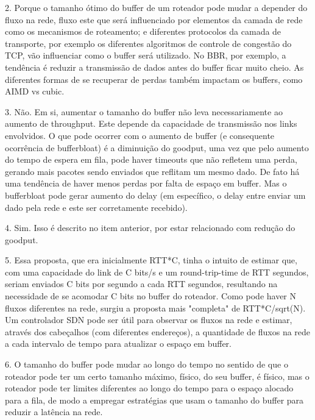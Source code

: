 \documentclass[a4paper,12pt]{article}
\begin{document}
2. Porque o tamanho ótimo do buffer de um roteador pode mudar a depender do fluxo na rede, fluxo este que será influenciado por elementos da camada de rede como os mecanismos de roteamento; e diferentes protocolos da camada de transporte, por exemplo os diferentes algoritmos de controle de congestão do TCP, vão influenciar como o buffer será utilizado. No BBR, por exemplo, a tendência é reduzir a transmissão de dados antes do buffer ficar  muito cheio. As diferentes formas de se recuperar de perdas também impactam os buffers,  como AIMD vs cubic.

3. Não. Em si, aumentar o tamanho do buffer não leva necessariamente ao aumento de throughput. Este depende da capacidade de transmissão nos links envolvidos. O que pode ocorrer com o  aumento de buffer (e consequente ocorrência de bufferbloat) é a diminuição do goodput, uma vez que pelo aumento do tempo de espera em fila, pode haver timeouts que não refletem uma perda, gerando mais pacotes sendo enviados que reflitam um mesmo dado. De fato há uma tendência de haver menos perdas por falta de espaço em buffer. Mas o bufferbloat pode gerar aumento do delay (em específico, o delay entre enviar um dado pela rede e este ser corretamente recebido).

4. Sim. Isso é descrito no item anterior, por estar relacionado com redução do goodput.	

5. Essa proposta, que era inicialmente RTT*C, tinha o intuito de estimar que, com uma capacidade do link de C bits/s e um round-trip-time de RTT segundos, seriam enviados C bits por segundo a cada RTT segundos, resultando na necessidade de se acomodar C bits no buffer do roteador. Como  pode haver N fluxos diferentes na rede, surgiu a proposta mais "completa" de RTT*C/sqrt(N).  Um controlador SDN pode ser útil para observar os fluxos na rede e estimar, através dos cabeçalhos (com diferentes endereços), a quantidade de fluxos na rede a cada intervalo de tempo para atualizar o espaço em buffer.

6. O tamanho do buffer pode mudar ao longo do tempo no sentido de que o roteador pode ter um certo tamanho máximo, físico, do seu buffer, é físico, mas o roteador pode ter limites diferentes ao longo do tempo para  o espaço alocado para a fila, de modo a empregar estratégias que usam o tamanho do buffer para reduzir a latência na rede. 
\end{document}
